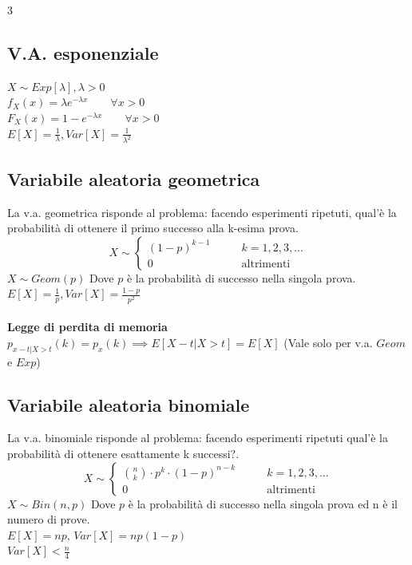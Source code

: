 \documentclass{article}
\begin{document}
\begin{multicols*}{3}
		
		\subsection{V.A. esponenziale}
		\(X\sim Exp[\lambda], \lambda > 0\)\\
		\(f_X(x) = \lambda e^{-\lambda x} \qquad \forall x>0\)\\
		\(F_X(x) = 1-e^{-\lambda x} \qquad \forall x>0\)\\
		\(E[X] = \frac{1}{\lambda}, Var[X] = \frac{1}{\lambda^2}\)\\
		\subsection{Variabile aleatoria geometrica}
		La v.a. geometrica risponde al problema: facendo esperimenti ripetuti, qual'è la probabilità di ottenere il primo successo alla k-esima prova.\\ 
		\begin{equation*}
			X \sim
			\left\{
			\begin{alignedat}{2}
				(1-p)^{k-1}  & \qquad k=1,2,3,...\\
				0            & \qquad \text{altrimenti}
			\end{alignedat}
			\right.
		\end{equation*}
		\(X \sim Geom(p)\) Dove \(p\) è la probabilità di successo nella singola prova.\\
		\(E[X] = \frac{1}{p}, Var[X] = \frac{1-p}{p^2}\)\\\\
		\textbf{Legge di perdita di memoria}\\
		\(p_{x-t|X>t}(k) = p_x (k) \implies E[X-t|X>t] = E[X]\) (Vale solo per v.a. \(Geom\) e \(Exp\))
		
		\subsection{Variabile aleatoria binomiale}
		La v.a. binomiale risponde al problema: facendo esperimenti ripetuti qual'è la probabilità di ottenere esattamente k successi?.\\ 
		\begin{equation*}
			X \sim
			\left\{
			\begin{alignedat}{2}
				\binom{n}{k}\cdot p^k \cdot (1-p)^{n-k}  & \qquad k=1,2,3,...\\
				0            & \qquad \text{altrimenti}
			\end{alignedat}
			\right.
		\end{equation*}
		\(X \sim Bin(n,p)\) Dove \(p\) è la probabilità di successo nella singola prova ed n è il numero di prove.\\
		\(E[X] = np\), \(Var[X] = np(1-p)\)\\
		\(Var[X]< \frac{n}{4}\)
		

\end{multicols*}
\end{document}
